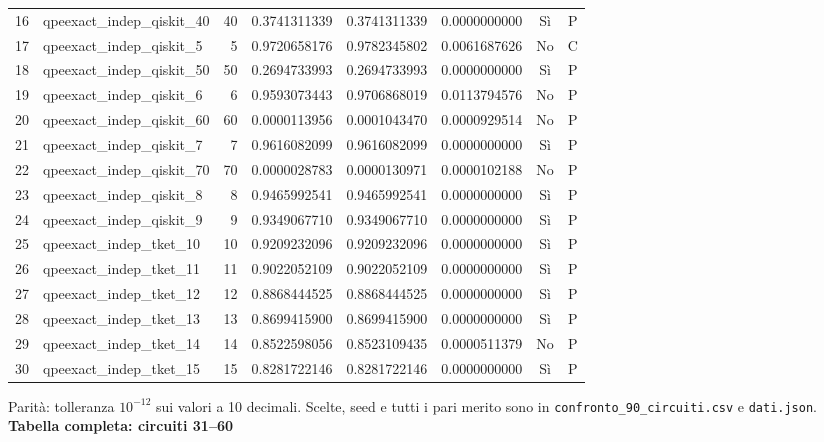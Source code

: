 \documentclass[10pt,a4paper,landscape]{article}
\newcommand{\titolo}[1]{{\Large\bfseries #1}\par\vspace{3mm}}
\begin{document}
{\begin{tabular}{rlrrrrcc}
16 & qpeexact\_indep\_qiskit\_40 & 40 & 0.3741311339 & 0.3741311339 & 0.0000000000 & Sì & P \\
17 & qpeexact\_indep\_qiskit\_5 & 5 & 0.9720658176 & 0.9782345802 & 0.0061687626 & No & C \\
18 & qpeexact\_indep\_qiskit\_50 & 50 & 0.2694733993 & 0.2694733993 & 0.0000000000 & Sì & P \\
19 & qpeexact\_indep\_qiskit\_6 & 6 & 0.9593073443 & 0.9706868019 & 0.0113794576 & No & P \\
20 & qpeexact\_indep\_qiskit\_60 & 60 & 0.0000113956 & 0.0001043470 & 0.0000929514 & No & P \\
21 & qpeexact\_indep\_qiskit\_7 & 7 & 0.9616082099 & 0.9616082099 & 0.0000000000 & Sì & P \\
22 & qpeexact\_indep\_qiskit\_70 & 70 & 0.0000028783 & 0.0000130971 & 0.0000102188 & No & P \\
23 & qpeexact\_indep\_qiskit\_8 & 8 & 0.9465992541 & 0.9465992541 & 0.0000000000 & Sì & P \\
24 & qpeexact\_indep\_qiskit\_9 & 9 & 0.9349067710 & 0.9349067710 & 0.0000000000 & Sì & P \\
25 & qpeexact\_indep\_tket\_10 & 10 & 0.9209232096 & 0.9209232096 & 0.0000000000 & Sì & P \\
26 & qpeexact\_indep\_tket\_11 & 11 & 0.9022052109 & 0.9022052109 & 0.0000000000 & Sì & P \\
27 & qpeexact\_indep\_tket\_12 & 12 & 0.8868444525 & 0.8868444525 & 0.0000000000 & Sì & P \\
28 & qpeexact\_indep\_tket\_13 & 13 & 0.8699415900 & 0.8699415900 & 0.0000000000 & Sì & P \\
29 & qpeexact\_indep\_tket\_14 & 14 & 0.8522598056 & 0.8523109435 & 0.0000511379 & No & P \\
30 & qpeexact\_indep\_tket\_15 & 15 & 0.8281722146 & 0.8281722146 & 0.0000000000 & Sì & P \\
\bottomrule
\end{tabular}

}\par\small Parità: tolleranza $10^{-12}$ sui valori a 10 decimali. Scelte, seed e tutti i pari merito sono in \texttt{confronto\_90\_circuiti.csv} e \texttt{dati.json}.
\newpage
\titolo{Tabella completa: circuiti 31--60}
\end{document}
